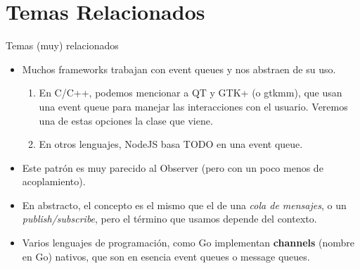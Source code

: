 \section{Temas Relacionados}

\begin{frame}{Temas (muy) relacionados}{
}
  \begin{itemize}

    \item Muchos frameworks trabajan con event queues y nos abstraen de su uso.
    \begin{enumerate}
      \item En C/C++, podemos mencionar a QT y GTK+ (o gtkmm), que usan una event queue para manejar las interacciones con el usuario. Veremos una de estas opciones la clase que viene.
      \item En otros lenguajes, NodeJS basa TODO en una event queue.
    \end{enumerate}

    \item Este patr\'on es muy parecido al Observer (pero con un poco menos de acoplamiento).

    \item En abstracto, el concepto es el mismo que el de una \textit{cola de mensajes}, o un \textit{publish/subscribe}, pero el t\'ermino que usamos depende del contexto.

    \item Varios lenguajes de programaci\'on, como Go implementan \textbf{channels} (nombre en Go) nativos, que son en esencia event queues o message queues.

  \end{itemize}

\end{frame}


